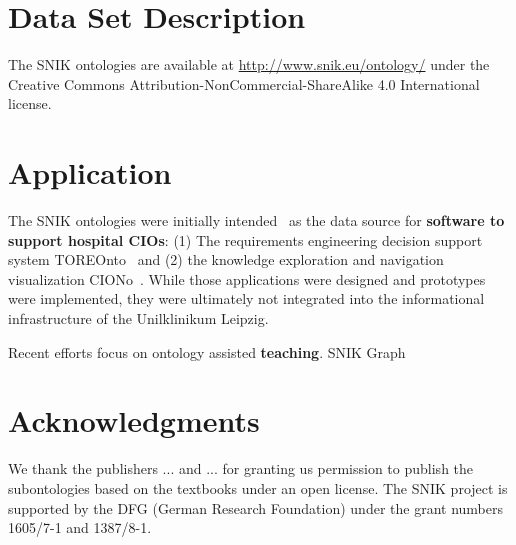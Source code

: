 \documentclass[sw]{iosart2x}
\renewcommand{\citet}{\cite}%
\renewcommand{\citep}{\cite}%
\begin{document}
\section{Data Set Description}\label{sec:dsd}
The SNIK ontologies are available at \url{http://www.snik.eu/ontology/} under the Creative Commons Attribution-NonCommercial-ShareAlike 4.0 International license.

\section{Application}\label{sec:application}
The SNIK ontologies were initially intended~\citep{domaene} as the data source for \textbf{software to support hospital CIOs}:
(1) The requirements engineering decision support system TOREOnto~\citep{toreonto} and (2) the knowledge exploration and navigation visualization CIONo~\citep{ciono}.
While those applications were designed and prototypes were implemented, they were ultimately not integrated into the informational infrastructure of the Unilklinikum Leipzig.

Recent efforts focus on ontology assisted \textbf{teaching}. 
SNIK Graph~\citep{snikgraph}



\section{Acknowledgments}
We thank the publishers ... and ... for granting us permission to publish the subontologies based on the textbooks \citet{bb,ob,he} under an open license.
The SNIK project is supported by the DFG (German Research Foundation) under the grant numbers 1605/7-1 and 1387/8-1.


\end{document}
